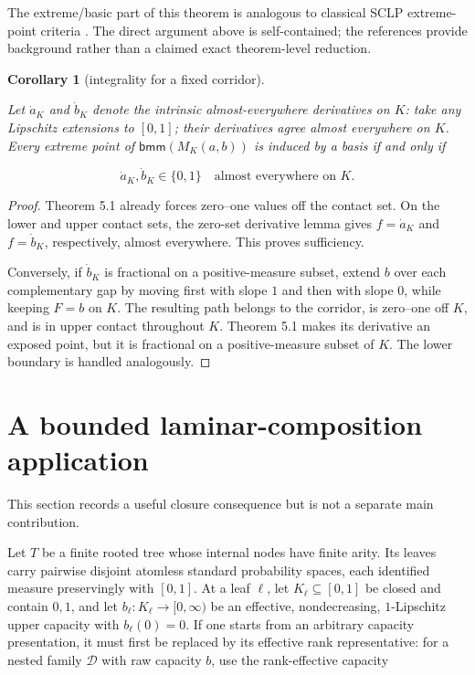 \documentclass[11pt]{article}
\newtheorem{corollary}[theorem]{Corollary}
\numberwithin{equation}{section}
\begin{document}
The extreme/basic part of this theorem is analogous to classical SCLP extreme-point
criteria \cite{anderson1983,andersonnash1987}. The direct argument above is self-contained; the references provide
background rather than a claimed exact theorem-level reduction.

\begin{corollary}[integrality for a fixed corridor]
\label{cor:integrality}

Let $\dot a_K$ and $\dot b_K$ denote the intrinsic almost-everywhere derivatives on
$K$: take any Lipschitz extensions to $[0,1]$; their derivatives agree almost
everywhere on $K$. Every extreme point of $\mathsf{bmm}(M_K(a,b))$ is induced by a
basis if and only if

\nopagebreak[4]
\[
\dot a_K,\dot b_K\in\{0,1\}
\quad\text{almost everywhere on }K.
\]

\end{corollary}

\begin{proof}

Theorem 5.1 already forces zero--one values off the contact set. On the lower and upper
contact sets, the zero-set derivative lemma gives $f=\dot a_K$ and
$f=\dot b_K$, respectively, almost everywhere. This proves sufficiency.

Conversely, if $\dot b_K$ is fractional on a positive-measure subset, extend $b$ over
each complementary gap by moving first with slope $1$ and then with slope $0$, while
keeping $F=b$ on $K$. The resulting path belongs to the corridor, is zero--one off
$K$, and is in upper contact throughout $K$. Theorem 5.1 makes its derivative an
exposed point, but it is fractional on a positive-measure subset of $K$. The lower
boundary is handled analogously.
\end{proof}


\section{A bounded laminar-composition application}


This section records a useful closure consequence but is not a separate main
contribution.

Let $T$ be a finite rooted tree whose internal nodes have finite arity. Its leaves carry
pairwise disjoint atomless standard probability spaces, each identified measure
preservingly with $[0,1]$. At a leaf $\ell$, let
$K_\ell\subseteq[0,1]$ be closed and contain $0,1$, and let
$b_\ell:K_\ell\to[0,\infty)$ be an effective, nondecreasing, $1$-Lipschitz upper
capacity with $b_\ell(0)=0$. If one starts from an arbitrary capacity presentation, it
must first be replaced by its effective rank representative: for a nested family
$\mathcal D$ with raw capacity $b$, use the rank-effective capacity
\end{document}
